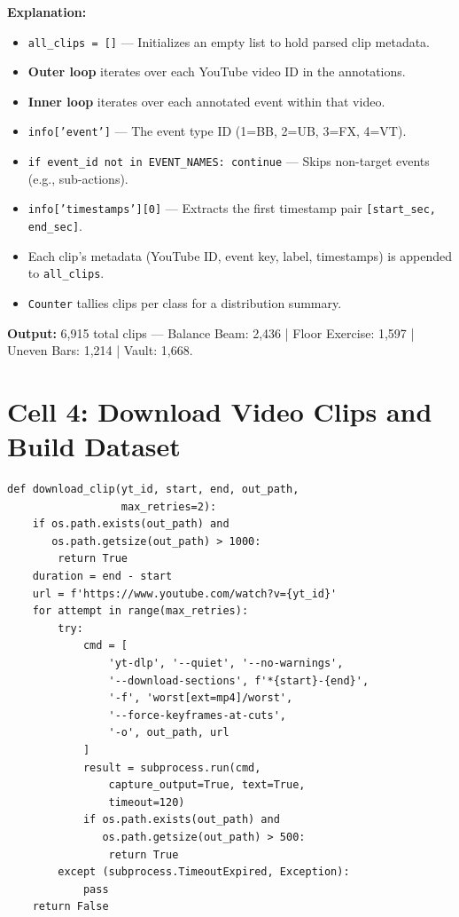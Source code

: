 \documentclass[a4paper, 12pt]{article}
\newenvironment{explanation}{%
  \par\smallskip
  \noindent\textcolor{blue!70!black}{\textbf{Explanation:}}\\
  \noindent
}{\par\medskip}
\begin{document}
\begin{explanation}
\begin{itemize}[nosep]
  \item \texttt{all\_clips = []} --- Initializes an empty list to hold parsed clip metadata.
  \item \textbf{Outer loop} iterates over each YouTube video ID in the annotations.
  \item \textbf{Inner loop} iterates over each annotated event within that video.
  \item \texttt{info['event']} --- The event type ID (1=BB, 2=UB, 3=FX, 4=VT).
  \item \texttt{if event\_id not in EVENT\_NAMES: continue} --- Skips non-target events (e.g., sub-actions).
  \item \texttt{info['timestamps'][0]} --- Extracts the first timestamp pair \texttt{[start\_sec, end\_sec]}.
  \item Each clip's metadata (YouTube ID, event key, label, timestamps) is appended to \texttt{all\_clips}.
  \item \texttt{Counter} tallies clips per class for a distribution summary.
\end{itemize}
\textbf{Output:} 6,915 total clips --- Balance Beam: 2,436 | Floor Exercise: 1,597 | Uneven Bars: 1,214 | Vault: 1,668.
\end{explanation}

\newpage
\section{Cell 4: Download Video Clips and Build Dataset}

\begin{lstlisting}
def download_clip(yt_id, start, end, out_path,
                  max_retries=2):
    if os.path.exists(out_path) and
       os.path.getsize(out_path) > 1000:
        return True
    duration = end - start
    url = f'https://www.youtube.com/watch?v={yt_id}'
    for attempt in range(max_retries):
        try:
            cmd = [
                'yt-dlp', '--quiet', '--no-warnings',
                '--download-sections', f'*{start}-{end}',
                '-f', 'worst[ext=mp4]/worst',
                '--force-keyframes-at-cuts',
                '-o', out_path, url
            ]
            result = subprocess.run(cmd,
                capture_output=True, text=True,
                timeout=120)
            if os.path.exists(out_path) and
               os.path.getsize(out_path) > 500:
                return True
        except (subprocess.TimeoutExpired, Exception):
            pass
    return False
\end{lstlisting}
\end{document}
